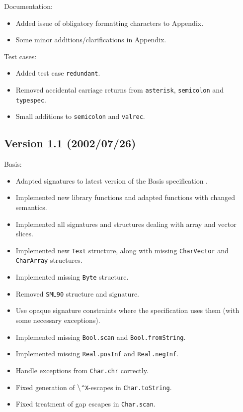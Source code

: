 \documentclass[twoside,titlepage]{article}
\begin{document}
\begin{appendix}
Documentation:
\begin{itemize}[nolistsep]
\item Added issue of obligatory formatting characters to Appendix.
\item Some minor additions/clarifications in Appendix.
\end{itemize}

Test cases:
\begin{itemize}[nolistsep]
\item Added test case {\tt redundant}.
\item Removed accidental carriage returns from {\tt asterisk}, {\tt semicolon} and {\tt typespec}.
\item Small additions to {\tt semicolon} and {\tt valrec}.
\end{itemize}

\subsection*{Version 1.1 (2002/07/26)}

Basis:
\begin{itemize}[nolistsep]
\item Adapted signatures to latest version of the Basis specification \cite{basis}.
\item Implemented new library functions and adapted functions with changed semantics.
\item Implemented all signatures and structures dealing with array and vector slices.
\item Implemented new {\tt Text} structure, along with missing {\tt CharVector} and {\tt CharArray} structures.
\item Implemented missing {\tt Byte} structure.
\item Removed {\tt SML90} structure and signature.
\item Use opaque signature constraints where the specification uses them (with some necessary exceptions).
\item Implemented missing {\tt Bool.scan} and {\tt Bool.fromString}.
\item Implemented missing {\tt Real.posInf} and {\tt Real.negInf}.
\item Handle exceptions from {\tt Char.chr} correctly.
\item Fixed generation of $\tt\backslash${\tt\^{}X}-escapes in {\tt Char.toString}.
\item Fixed treatment of gap escapes in {\tt Char.scan}.
\end{itemize}


\end{appendix}
\end{document}
